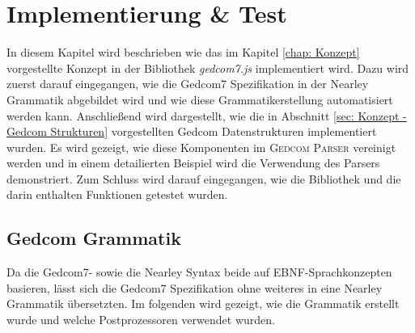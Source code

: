 \chapter{Implementierung \& Test}
\label{chap: Implementierung und Test}
In diesem Kapitel wird beschrieben wie das im Kapitel \ref{chap: Konzept} vorgestellte Konzept in der Bibliothek \textit{gedcom7.js} implementiert wird. Dazu wird zuerst darauf eingegangen, wie die Gedcom7 Spezifikation in der Nearley Grammatik abgebildet wird und wie diese Grammatikerstellung automatisiert werden kann. Anschließend wird dargestellt, wie die in Abschnitt \ref{sec: Konzept - Gedcom Strukturen} vorgestellten Gedcom Datenstrukturen implementiert wurden. Es wird gezeigt, wie diese Komponenten im \textsc{Gedcom Parser} vereinigt werden und in einem detailierten Beispiel wird die Verwendung des Parsers demonstriert. Zum Schluss wird darauf eingegangen, wie die Bibliothek und die darin enthalten Funktionen getestet wurden.

\section{Gedcom Grammatik}
\label{sec: Implementierung - Gedcom Grammatik}
Da die Gedcom7- sowie die Nearley Syntax beide auf EBNF-Sprachkonzepten basieren, lässt sich die Gedcom7 Spezifikation ohne weiteres in eine Nearley Grammatik übersetzten. Im folgenden wird gezeigt, wie die Grammatik erstellt wurde und welche Postprozessoren verwendet wurden. 
